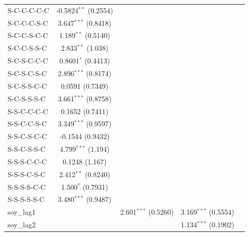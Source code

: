 \begin{tabular}{lcccc}
   S-C-C-C-C-C       & -0.5824$^{**}$ (0.2554) &                        &                        &   \\   
   S-C-C-C-S-C       & 3.647$^{***}$ (0.8418)  &                        &                        &   \\   
   S-C-C-S-C-C       & 1.189$^{**}$ (0.5140)   &                        &                        &   \\   
   S-C-C-S-S-C       & 2.833$^{**}$ (1.038)    &                        &                        &   \\   
   S-C-S-C-C-C       & 0.8601$^{*}$ (0.4413)   &                        &                        &   \\   
   S-C-S-C-S-C       & 2.896$^{***}$ (0.8174)  &                        &                        &   \\   
   S-C-S-S-C-C       & 0.0591 (0.7349)         &                        &                        &   \\   
   S-C-S-S-S-C       & 3.661$^{***}$ (0.8758)  &                        &                        &   \\   
   S-S-C-C-C-C       & 0.1652 (0.7411)         &                        &                        &   \\   
   S-S-C-C-S-C       & 3.349$^{***}$ (0.9597)  &                        &                        &   \\   
   S-S-C-S-C-C       & -0.1544 (0.9432)        &                        &                        &   \\   
   S-S-C-S-S-C       & 4.799$^{***}$ (1.194)   &                        &                        &   \\   
   S-S-S-C-C-C       & 0.1248 (1.167)          &                        &                        &   \\   
   S-S-S-C-S-C       & 2.412$^{**}$ (0.8240)   &                        &                        &   \\   
   S-S-S-S-C-C       & 1.500$^{*}$ (0.7931)    &                        &                        &   \\   
   S-S-S-S-S-C       & 3.480$^{***}$ (0.9487)  &                        &                        &   \\   
   soy\_lag1         &                         & 2.601$^{***}$ (0.5260) & 3.169$^{***}$ (0.5554) &   \\   
   soy\_lag2         &                         &                        & 1.134$^{***}$ (0.1902) &   \\   

\end{tabular}
